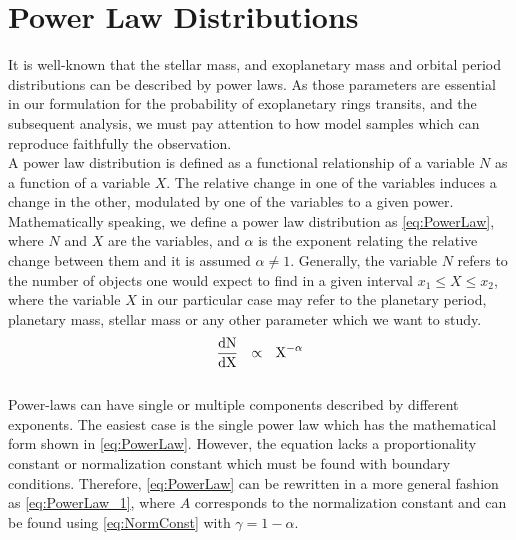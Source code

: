 \section{Power Law Distributions} \label{sec:PowerLawSec}

It is well-known that the stellar mass, and exoplanetary mass and orbital period distributions can be described by power laws. As those parameters are essential in our formulation for the probability of exoplanetary rings transits, and the subsequent analysis, we must pay attention to how model samples which can reproduce faithfully the observation.\\

A power law distribution is defined as a functional relationship of a variable $N$ as a function of a variable $X$. The relative change in one of the variables induces a change in the other, modulated by one of the variables to a given power.   
Mathematically speaking, we define a power law distribution as \autoref{eq:PowerLaw}, where $N$ and $X$ are the variables, and $\alpha$ is the exponent relating the relative change between them and it is assumed $\alpha \neq 1$. Generally, the variable $N$ refers to the number of objects one would expect to find in a given interval $x_1 \leq X \leq x_2$, where the variable $X$ in our particular case may refer to the planetary period, planetary mass, stellar mass or any other parameter which we want to study.\\ 

\begingroup
\Large
\begin{equation}
 \frac{\textnormal{dN}}{\textnormal{dX}}~~\propto~~\textnormal{X}^{-\alpha}
 \label{eq:PowerLaw}
\end{equation}
\endgroup\\

Power-laws can have single or multiple components described by different exponents. The easiest case is the single power law which has the mathematical form shown in \autoref{eq:PowerLaw}. However, the equation lacks a proportionality constant or normalization constant which must be found with boundary conditions. Therefore, \autoref{eq:PowerLaw} can be rewritten in a more general fashion as \autoref{eq:PowerLaw_1}, where $A$ corresponds to the normalization constant and can be found using \autoref{eq:NormConst} with $\gamma = 1 - \alpha$.\\

